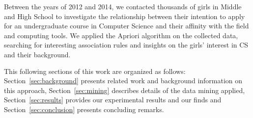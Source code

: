 %

Between the years of 2012 and 2014, we contacted thousands of girls in Middle and High School to investigate the relationship between their intention to apply for an undergraduate course in Computer Science and their affinity with the field and computing tools. We applied the Apriori algorithm on the collected data, searching for interesting association rules and insights on the girls' interest in CS and their background.

This following sections of this work are organized as follows: Section~\ref{sec:background} presents related work and background information on this approach, Section~\ref{sec:mining} describes details of the data mining applied, Section~\ref{sec:results} provides our experimental results and our finds and Section~\ref{sec:conclusion} presents concluding remarks.
